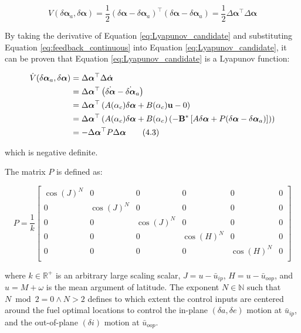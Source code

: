 \begin{equation}
V(\delta \boldsymbol{\alpha}_a, \delta \boldsymbol{\alpha}) = \frac{1}{2} (\delta \boldsymbol{\alpha} - \delta \boldsymbol{\alpha}_a)^\top (\delta \boldsymbol{\alpha} - \delta \boldsymbol{\alpha}_a) 
= \frac{1}{2} \Delta \boldsymbol{\alpha}^\top \Delta \boldsymbol{\alpha}
\label{eq:Lyapunov_candidate}
\end{equation}

By taking the derivative of Equation \ref{eq:Lyapunov_candidate} and substituting Equation \ref{eq:feedback_continuous} into Equation \ref{eq:Lyapunov_candidate}, it can be proven that Equation \ref{eq:Lyapunov_candidate} is a Lyapunov function:

\begin{align}
\dot{V}(\delta \boldsymbol{\alpha}_a, \delta \boldsymbol{\alpha}) 
&= \Delta \boldsymbol{\alpha}^\top \Delta \dot{\boldsymbol{\alpha}} \notag \\
&= \Delta \boldsymbol{\alpha}^\top \left( \dot{\delta \boldsymbol{\alpha}} - \dot{\delta \boldsymbol{\alpha}}_a \right) \notag \\
&= \Delta \boldsymbol{\alpha}^\top \left( A(\alpha_c) \delta \boldsymbol{\alpha} + B(\alpha_c) \mathbf{u} - 0 \right) \notag \\
&= \Delta \boldsymbol{\alpha}^\top \left( A(\alpha_c) \delta \boldsymbol{\alpha} + B(\alpha_c) \left( -\mathbf{B}^* \left[ A \delta \boldsymbol{\alpha} + P(\delta \boldsymbol{\alpha} - \delta \boldsymbol{\alpha}_a) \right] \right) \right) \notag \\
&= -\Delta \boldsymbol{\alpha}^\top P \Delta \boldsymbol{\alpha}
\tag{4.3}
\end{align}

which is negative definite.

The matrix \( P \) is defined as:

\[
P = \frac{1}{k} \begin{bmatrix}
\cos(J)^N & 0 & 0 & 0 & 0 & 0 \\
0 & \cos(J)^N & 0 & 0 & 0 & 0 \\
0 & 0 & \cos(J)^N & 0 & 0 & 0 \\
0 & 0 & 0 & \cos(H)^N & 0 & 0 \\
0 & 0 & 0 & 0 & \cos(H)^N & 0 \\
\end{bmatrix}
\]

where \( k \in \mathbb{R}^{+} \) is an arbitrary large scaling scalar, 
\( J = u - \bar{u}_{ip} \), \( H = u - \bar{u}_{oop} \), and 
\( u = M + \omega \) is the mean argument of latitude. 
The exponent \( N \in \mathbb{N} \) such that \( N \bmod 2 = 0 \land N > 2 \) 
defines to which extent the control inputs are centered around the fuel optimal locations to control the in-plane \((\delta a, \delta e)\) motion at \( \bar{u}_{ip} \), and the out-of-plane \((\delta i)\) motion at \( \bar{u}_{oop} \).

